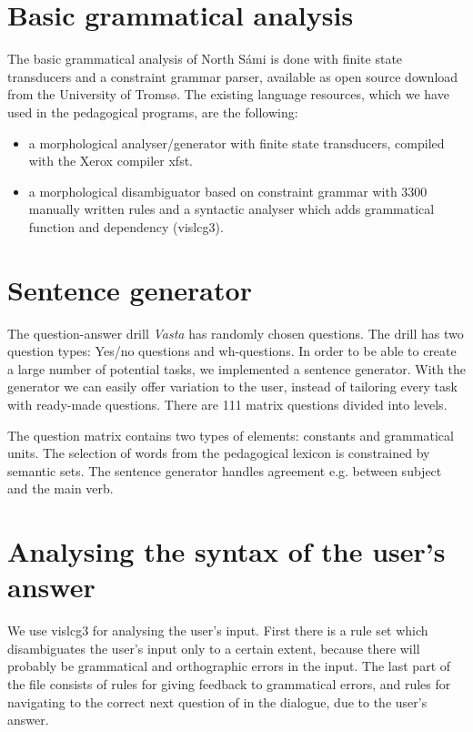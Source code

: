 \documentclass[11pt]{article}
\begin{document}
\section{Basic grammatical analysis}
The basic grammatical analysis of North Sámi is done with finite state transducers and a constraint grammar parser, available as open source download from the University of Tromsø. The existing language resources, which we have used in the pedagogical programs, are the following:

\begin{itemize}
\item a morphological analyser/generator with finite state transducers, compiled with the Xerox compiler xfst.  
\item a morphological disambiguator based on constraint grammar with 3300 manually written rules and a syntactic analyser which adds grammatical function and dependency (vislcg3). 
\end{itemize}


\section{Sentence generator}
The question-answer drill \textit{Vasta} has randomly chosen questions. The drill has two question types: Yes/no questions and wh-questions. In order to be able to create a large number of potential tasks, we implemented a sentence generator. With the generator we can easily offer variation to the user, instead of tailoring every task with ready-made questions. There are 111 matrix questions divided into levels.

The question matrix contains two types of elements: constants and grammatical units. The selection of words from the pedagogical lexicon is constrained by semantic sets. The sentence generator handles agreement e.g. between subject and the main verb.
 
\section{Analysing the syntax of the user's answer} 
We use vislcg3 for analysing the user's input. First there is a rule set which disambiguates the user's input only to a certain extent, because there will probably be grammatical and orthographic errors in the input. The last part of the file consists of rules for giving feedback to grammatical errors, and rules for navigating to the correct next question of in the dialogue, due to the user's answer.  
\end{document}
